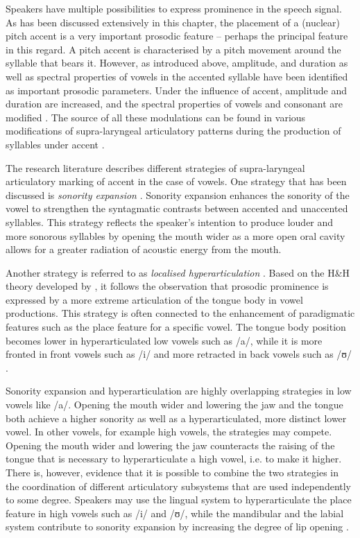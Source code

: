 Speakers have multiple possibilities to express prominence in the speech signal. As has been discussed extensively in this chapter, the placement of a (nuclear) pitch accent is a very important prosodic feature -- perhaps the principal feature in this regard. A pitch accent is characterised by a pitch movement around the syllable that bears it. However, as introduced above, amplitude, and duration \citep{Ladd2008, Grice2006} as well as spectral properties of vowels in the accented syllable \citep{Cho2011, Gussenhoven2004} have been identified as important prosodic parameters. Under the influence of accent, amplitude and duration are increased, and the spectral properties of vowels and consonant are modified \citep{Cho2011}. The source of all these modulations can be found in various modifications of supra-laryngeal articulatory patterns during the production of syllables under accent \citep{Mücke2018, Cho2005, DeJong1995, BeckmanEdwardsFletcher1992, DeJongBeckmanEdwards1993, HarringtonFletcherBeckman2000, ChoMcQueen2005, MückeGrice2014}.

The research literature describes different strategies of supra-laryngeal articulatory marking of accent in the case of vowels. One strategy that has been discussed is \emph{sonority expansion} \citep{BeckmanEdwardsFletcher1992}. Sonority expansion enhances the sonority of the vowel to strengthen the syntagmatic contrasts between accented and unaccented syllables. This strategy reflects the speaker's intention to produce louder and more sonorous
syllables by opening the mouth wider as a more open oral cavity allows for a greater radiation of acoustic energy from the mouth.

Another strategy is referred to as \emph{localised hyperarticulation} \citep{DeJong1995}. Based on the H\&H theory developed by \citet{Lindblom1990}, it follows the observation that prosodic prominence is expressed by a more extreme articulation of the tongue body in vowel productions. This strategy is often connected to the enhancement of paradigmatic features such as the place feature for a specific vowel. The tongue body position becomes lower in hyperarticulated low vowels such as /a/, while it is more fronted in front vowels such as /i/ and more retracted in back vowels such as /ʊ/ \citep{DeJongBeckmanEdwards1993, HarringtonFletcherBeckman2000, ChoMcQueen2005}.

Sonority expansion and hyperarticulation are highly overlapping strategies in low vowels like /a/. Opening the mouth wider and lowering the jaw and the tongue both achieve a higher sonority as well as a hyperarticulated, more distinct lower vowel. In other vowels, for example high vowels, the strategies may compete. Opening the mouth wider and lowering the jaw counteracts the raising of the tongue that is necessary to hyperarticulate a high vowel, i.e. to make it higher. There is, however, evidence that it is possible to combine the two strategies in the coordination of different articulatory subsystems that are used independently to some degree. Speakers may use the lingual system to hyperarticulate the place feature in high vowels such as /i/ and /ʊ/, while the mandibular and the labial system contribute to sonority expansion by increasing the degree of lip opening \citep{HarringtonFletcherBeckman2000}.


